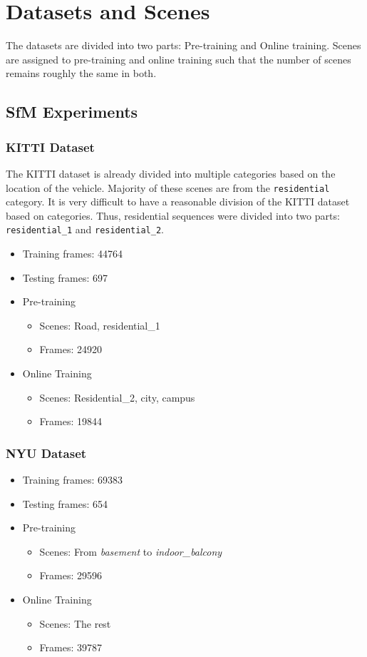 \documentclass[lettersize,journal]{IEEEtran}
\begin{document}
\section{Datasets and Scenes}
 The datasets are divided into two parts: Pre-training and Online training. Scenes are assigned to pre-training and online training such that the number of scenes remains roughly the same in both.
 \subsection{SfM Experiments}
 \subsubsection{KITTI Dataset}
 The KITTI dataset is already divided into multiple categories based on the location of the vehicle. Majority of these scenes are from the \texttt{residential} category. It is very difficult to have a reasonable division of the KITTI dataset based on categories. Thus, residential sequences were divided into two parts: \texttt{residential\_1} and \texttt{residential\_2}.
 \begin{itemize} 
    \item Training frames: 44764
    \item Testing frames: 697
    \item Pre-training 
    \begin{itemize} 
       \item Scenes: Road, residential\_1
       \item Frames: 24920 
    \end{itemize} 
    \item Online Training
    \begin{itemize} 
       \item Scenes: Residential\_2, city, campus 
       \item Frames: 19844
    \end{itemize} 
 \end{itemize}
 
 \subsubsection{NYU Dataset}
 \begin{itemize} 
    \item Training frames: 69383
    \item Testing frames: 654
    \item Pre-training 
    \begin{itemize} 
       \item Scenes: From \emph{basement} to \emph{indoor\_balcony}
       \item Frames: 29596 
    \end{itemize} 
    \item Online Training
    \begin{itemize} 
       \item Scenes: The rest  
       \item Frames: 39787
    \end{itemize} 
 \end{itemize}
 
\end{document}
